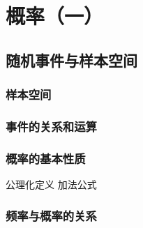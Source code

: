 
\chapter{概率（一）}


\section{随机事件与样本空间}
\subsection{样本空间}
\clearpage
\subsection{事件的关系和运算}
\clearpage
\subsection{概率的基本性质}
公理化定义 加法公式
\clearpage
\subsection{频率与概率的关系}
\clearpage
